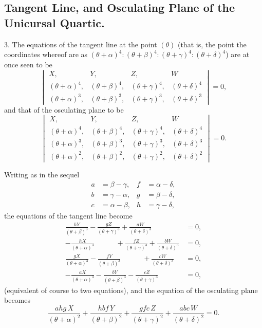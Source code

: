 \documentclass[11pt,a4paper]{article}
\begin{document}
\subsection*{Tangent Line, and Osculating Plane of the Unicursal Quartic.}

3. The equations of the tangent line at the point $(\theta)$ (that is, the point the coordinates whereof are as $(\theta + \alpha)^4 : (\theta + \beta)^4 : (\theta + \gamma)^4 : (\theta + \delta)^4$) are at once seen to be
\[
\begin{vmatrix}
X, & Y, & Z, & W \\
(\theta + \alpha)^4, & (\theta + \beta)^4, & (\theta + \gamma)^4, & (\theta + \delta)^4 \\
(\theta + \alpha)^3, & (\theta + \beta)^3, & (\theta + \gamma)^3, & (\theta + \delta)^3
\end{vmatrix} = 0,
\]
and that of the osculating plane to be
\[
\begin{vmatrix}
X, & Y, & Z, & W \\
(\theta + \alpha)^4, & (\theta + \beta)^4, & (\theta + \gamma)^4, & (\theta + \delta)^4 \\
(\theta + \alpha)^3, & (\theta + \beta)^3, & (\theta + \gamma)^3, & (\theta + \delta)^3 \\
(\theta + \alpha)^2, & (\theta + \beta)^2, & (\theta + \gamma)^2, & (\theta + \delta)^2
\end{vmatrix} = 0.
\]

Writing as in the sequel
\begin{align*}
a &= \beta - \gamma, & f &= \alpha - \delta, \\
b &= \gamma - \alpha, & g &= \beta - \delta, \\
c &= \alpha - \beta, & h &= \gamma - \delta,
\end{align*}
the equations of the tangent line become
\begin{align*}
\frac{hY}{(\theta + \beta)^3} - \frac{gZ}{(\theta + \gamma)^3} + \frac{aW}{(\theta + \delta)^3} &= 0, \\
-\frac{hX}{(\theta + \alpha)^3} \qquad\quad + \frac{fZ}{(\theta + \gamma)^3} + \frac{bW}{(\theta + \delta)^3} &= 0, \\
\frac{gX}{(\theta + \alpha)^3} - \frac{fY}{(\theta + \beta)^3} \qquad\quad + \frac{cW}{(\theta + \delta)^3} &= 0, \\
-\frac{aX}{(\theta + \alpha)^3} - \frac{bY}{(\theta + \beta)^3} - \frac{cZ}{(\theta + \gamma)^3} \qquad\quad &= 0,
\end{align*}
(equivalent of course to two equations), and the equation of the osculating plane becomes
\[
\frac{ahg\,X}{(\theta + \alpha)^2} + \frac{hbf\,Y}{(\theta + \beta)^2} + \frac{gfc\,Z}{(\theta + \gamma)^2} + \frac{abc\,W}{(\theta + \delta)^2} = 0.
\]
\end{document}
